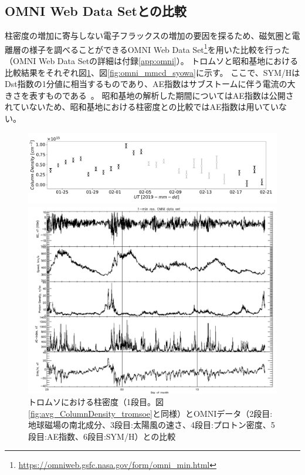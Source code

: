\subsection{OMNI Web Data Setとの比較}
\label{ssec:comparison_omni}
柱密度の増加に寄与しない電子フラックスの増加の要因を探るため、磁気圏と電離層の様子を調べることができるOMNI Web Data Set\footnote{\url{https://omniweb.gsfc.nasa.gov/form/omni_min.html}}を用いた比較を行った（OMNI Web Data Setの詳細は付録\ref{app:omni}）。
トロムソと昭和基地における比較結果をそれぞれ図\ref{fig:omni_mmcd_tromsoe}、図\ref{fig:omni_mmcd_syowa}に示す。
ここで、SYM/HはDst指数の1分値に相当するものであり、AE指数はサブストームに伴う電流の大きさを表すものである~\cite{wdc2009asysym,wdc2022onAEindex}。
昭和基地の解析した期間についてはAE指数は公開されていないため、昭和基地における柱密度との比較ではAE指数は用いていない。\par
\begin{figure}[htbp]
    \centering
    \begin{minipage}{\linewidth}
        \centering
        \includegraphics[width=\linewidth]{master_thesis_contents/master_thesis_fig/avg_ColumnDensity_tromsoe.pdf}
    \end{minipage}
    \begin{minipage}{\linewidth}
        \centering
        \includegraphics[width=\linewidth]{master_thesis_contents/master_thesis_fig/omni_tromsoe.pdf}
    \end{minipage}
    \caption{トロムソにおける柱密度（1段目。図\ref{fig:avg_ColumnDensity_tromsoe}と同様）とOMNIデータ（2段目:地球磁場の南北成分、3段目:太陽風の速さ、4段目:プロトン密度、5段目:AE指数、6段目:SYM/H）との比較}
    \label{fig:omni_mmcd_tromsoe}
\end{figure}

